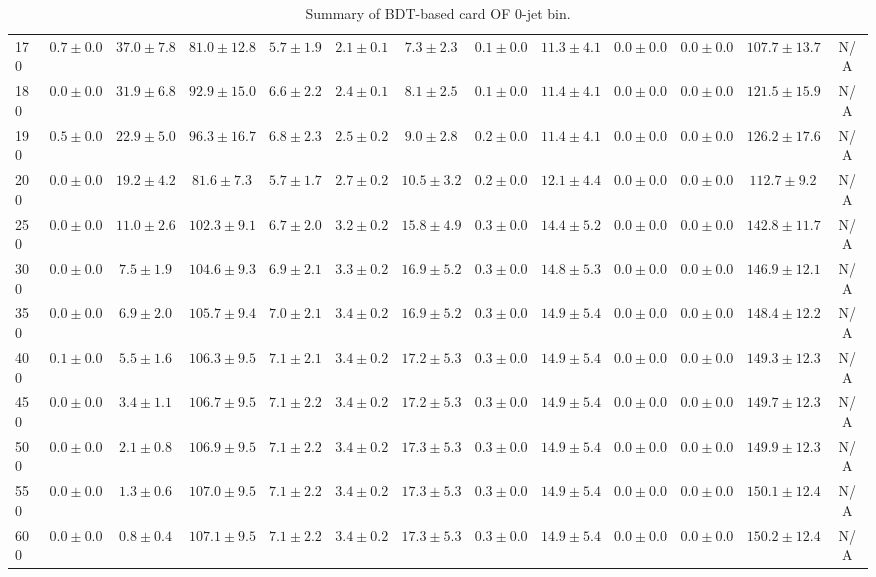 \begin{table}
{\begin{center}
\begin{tabular}{l | c c | c c c c c c c c  | c c}
170 & $0.7\pm0.0$ & $37.0\pm7.8$ & $81.0\pm12.8$ & $5.7\pm1.9$ & $2.1\pm0.1$ & $7.3\pm2.3$ & $0.1\pm0.0$ & $11.3\pm4.1$ & $0.0\pm0.0$ & $0.0\pm0.0$ & $107.7\pm13.7$ &  N/A \\
180 & $0.0\pm0.0$ & $31.9\pm6.8$ & $92.9\pm15.0$ & $6.6\pm2.2$ & $2.4\pm0.1$ & $8.1\pm2.5$ & $0.1\pm0.0$ & $11.4\pm4.1$ & $0.0\pm0.0$ & $0.0\pm0.0$ & $121.5\pm15.9$ & N/A \\
190 & $0.5\pm0.0$ & $22.9\pm5.0$ & $96.3\pm16.7$ & $6.8\pm2.3$ & $2.5\pm0.2$ & $9.0\pm2.8$ & $0.2\pm0.0$ & $11.4\pm4.1$ & $0.0\pm0.0$ & $0.0\pm0.0$ & $126.2\pm17.6$ & N/A \\
200 & $0.0\pm0.0$ & $19.2\pm4.2$ & $81.6\pm7.3$ & $5.7\pm1.7$ & $2.7\pm0.2$ & $10.5\pm3.2$ & $0.2\pm0.0$ & $12.1\pm4.4$ & $0.0\pm0.0$ & $0.0\pm0.0$ & $112.7\pm9.2$ & N/A \\
250 & $0.0\pm0.0$ & $11.0\pm2.6$ & $102.3\pm9.1$ & $6.7\pm2.0$ & $3.2\pm0.2$ & $15.8\pm4.9$ & $0.3\pm0.0$ & $14.4\pm5.2$ & $0.0\pm0.0$ & $0.0\pm0.0$ & $142.8\pm11.7$ & N/A \\
300 & $0.0\pm0.0$ & $7.5\pm1.9$ & $104.6\pm9.3$ & $6.9\pm2.1$ & $3.3\pm0.2$ & $16.9\pm5.2$ & $0.3\pm0.0$ & $14.8\pm5.3$ & $0.0\pm0.0$ & $0.0\pm0.0$ & $146.9\pm12.1$ &  N/A \\
350 & $0.0\pm0.0$ & $6.9\pm2.0$ & $105.7\pm9.4$ & $7.0\pm2.1$ & $3.4\pm0.2$ & $16.9\pm5.2$ & $0.3\pm0.0$ & $14.9\pm5.4$ & $0.0\pm0.0$ & $0.0\pm0.0$ & $148.4\pm12.2$ &  N/A \\
400 & $0.1\pm0.0$ & $5.5\pm1.6$ & $106.3\pm9.5$ & $7.1\pm2.1$ & $3.4\pm0.2$ & $17.2\pm5.3$ & $0.3\pm0.0$ & $14.9\pm5.4$ & $0.0\pm0.0$ & $0.0\pm0.0$ & $149.3\pm12.3$ &  N/A \\
450 & $0.0\pm0.0$ & $3.4\pm1.1$ & $106.7\pm9.5$ & $7.1\pm2.2$ & $3.4\pm0.2$ & $17.2\pm5.3$ & $0.3\pm0.0$ & $14.9\pm5.4$ & $0.0\pm0.0$ & $0.0\pm0.0$ & $149.7\pm12.3$ &  N/A \\
500 & $0.0\pm0.0$ & $2.1\pm0.8$ & $106.9\pm9.5$ & $7.1\pm2.2$ & $3.4\pm0.2$ & $17.3\pm5.3$ & $0.3\pm0.0$ & $14.9\pm5.4$ & $0.0\pm0.0$ & $0.0\pm0.0$ & $149.9\pm12.3$ &  N/A \\
550 & $0.0\pm0.0$ & $1.3\pm0.6$ & $107.0\pm9.5$ & $7.1\pm2.2$ & $3.4\pm0.2$ & $17.3\pm5.3$ & $0.3\pm0.0$ & $14.9\pm5.4$ & $0.0\pm0.0$ & $0.0\pm0.0$ & $150.1\pm12.4$ &  N/A \\
600 & $0.0\pm0.0$ & $0.8\pm0.4$ & $107.1\pm9.5$ & $7.1\pm2.2$ & $3.4\pm0.2$ & $17.3\pm5.3$ & $0.3\pm0.0$ & $14.9\pm5.4$ & $0.0\pm0.0$ & $0.0\pm0.0$ & $150.2\pm12.4$ &  N/A \\
\hline
\end{tabular}
\end{center}
}
\caption{Summary of BDT-based card OF 0-jet bin.}
\end{table}
